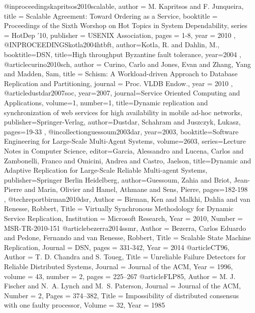 @inproceedings{kapritsos2010scalable,
   author    = {M. Kapritsos and F. Junqueira},
   title     = {Scalable Agreement: Toward Ordering as a Service},
   booktitle = {Proceedings of the Sixth Worshop on Hot Topics in System Dependability},
   series    = {HotDep '10},
   publisher = {{USENIX} Association},
   pages     = {1-8},
   year      = {2010}
},
@INPROCEEDINGS{kotla2004htbft,
author={Kotla, R. and Dahlin, M.},
booktitle={DSN},
title={High throughput Byzantine fault tolerance},
year={2004}
},
@article{curino2010sch,
 author = {Curino, Carlo and Jones, Evan and Zhang, Yang and Madden, Sam},
 title = {Schism: A Workload-driven Approach to Database Replication and Partitioning},
 journal = {Proc. VLDB Endow.},
 year = {2010}
},
@article{dustdar2007soc,
year={2007},
journal={Service Oriented Computing and Applications},
volume={1},
number={1},
title={Dynamic replication and synchronization of web services for high availability in mobile ad-hoc networks},
publisher={Springer-Verlag},
author={Dustdar, Schahram and Juszczyk, Lukasz},
pages={19-33}
},
@incollection{guessoum2003dar,
year={2003},
booktitle={Software Engineering for Large-Scale Multi-Agent Systems},
volume={2603},
series={Lecture Notes in Computer Science},
editor={Garcia, Alessandro and Lucena, Carlos and Zambonelli, Franco and Omicini, Andrea and Castro, Jaelson},
title={Dynamic and Adaptive Replication for Large-Scale Reliable Multi-agent Systems},
publisher={Springer Berlin Heidelberg},
author={Guessoum, Zahia and Briot, Jean-Pierre and Marin, Olivier and Hamel, Athmane and Sens, Pierre},
pages={182-198}
},
@techreport{birman2010dsr,
Author      = {Birman, Ken and Malkhi, Dahlia and van Renesse, Robbert},
Title       = {Virtually Synchronous Methodology for Dynamic Service Replication},
Institution = {Microsoft Research},
Year        = {2010},
Number      = {MSR-TR-2010-151}
}
@article{bezerra2014ssmr,
Author    = {Bezerra, Carlos Eduardo and Pedone, Fernando and van Renesse, Robbert},
Title     = {Scalable State Machine Replication},
Journal   = {DSN},
pages     = {331-342},
Year      = {2014}
}
@article{CT96,
Author    = {T. D. Chandra and S. Toueg},
Title     = {Unreliable Failure Detectors for Reliable Distributed Systems},
Journal   = {Journal of the ACM},
Year      = {1996},
volume    = {43},
number    = {2},
pages     = {225--267}
}
@article{FLP85,
Author    = {M. J. Fischer and N.~A. Lynch and M.~S. Paterson},
Journal   = {Journal of the ACM},
Number    = {2},
Pages     = {374--382},
Title     = {Impossibility of distributed consensus with one faulty processor},
Volume    = {32},
Year      = {1985}
}
